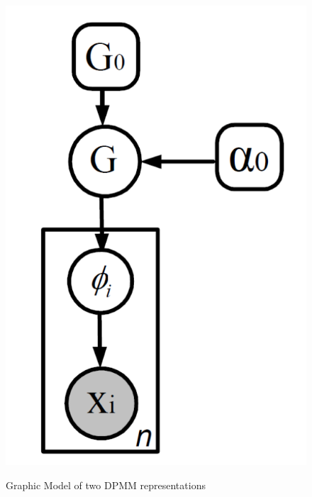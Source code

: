 \begin{figure}[tbph!]
{			 	\label{fig:crp}\includegraphics[scale=0.15]{CRP}}
		\caption{Graphic Model of two DPMM representations}
		\label{fig:GPM}
	 \end{figure}
